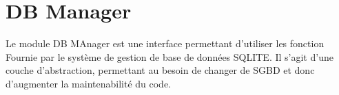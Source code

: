 \section{DB Manager} 

Le module DB MAnager est une interface permettant d'utiliser les fonction Fournie par le système de gestion de base de données SQLITE. Il s'agit d'une couche d'abstraction, permettant au besoin de changer de SGBD et donc d'augmenter la maintenabilité du code. 
